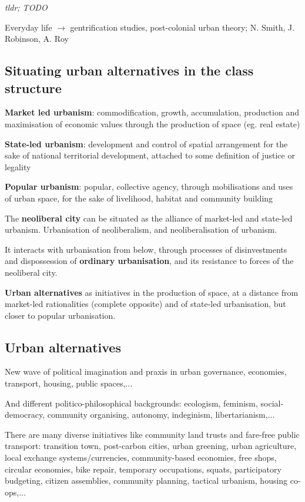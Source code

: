 \documentclass{article}
\begin{document}
\textit{tldr; TODO}

Everyday life $\rightarrow$ gentrification studies, post-colonial urban theory; N. Smith, J. Robinson, A. Roy

\subsection{Situating urban alternatives in the class structure}

\textbf{Market led urbanism}: commodification, growth, accumulation, production and maximisation of economic values through the production of space (eg. real estate)

\textbf{State-led urbanism}: development and control of spatial arrangement for the sake of national territorial development, attached to some definition of justice or legality

\textbf{Popular urbanism}: popular, collective agency, through mobilisations and uses of urban space, for the sake of livelihood, habitat and community building

The \textbf{neoliberal city} can be situated as the alliance of market-led and state-led urbanism.
Urbanisation of neoliberalism, and neoliberalisation of urbanism.

It interacts with urbanisation from below, through processes of disinvestments and dispossession of \textbf{ordinary urbanisation}, and its resistance to forces of the neoliberal city.

\textbf{Urban alternatives} as initiatives in the production of space, at a distance from market-led rationalities (complete opposite) and of state-led urbanisation, but closer to popular urbanisation.

\subsection{Urban alternatives}

New wave of political imagination and praxis in urban governance, economies, transport, housing, public spaces,...

And different politico-philosophical backgrounds: ecologism, feminism, social-democracy, community organising, autonomy, indeginism, libertarianism,...

There are many diverse initiatives like community land trusts and fare-free public transport: transition town, post-carbon cities, urban greening, urban agriculture, local exchange systems/currencies, community-based economies, free shops, circular economies, bike repair, temporary occupations, squats, participatory budgeting, citizen assemblies, community planning, tactical urbanism, housing co-ops,...
\end{document}
